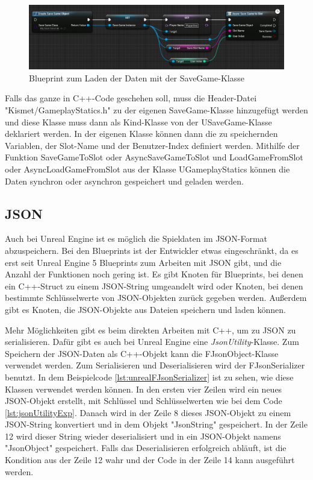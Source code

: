 \begin{figure}[htp]
    \centering
    \includegraphics[width=1\textwidth]{images/SaveGameBP.png}
    \caption{Blueprint zum Laden der Daten mit der SaveGame-Klasse\cite{unrealengineSavingLoading}}
    \label{fig:unrealSaveGameBluePrintLoad}
\end{figure}

Falls das ganze in C++-Code geschehen soll, muss die Header-Datei "Kismet/GameplayStatics.h" zu der eigenen SaveGame-Klasse hinzugefügt werden und diese Klasse muss dann als Kind-Klasse von der USaveGame-Klasse deklariert werden. In der eigenen Klasse können dann die zu speichernden Variablen, der Slot-Name und der Benutzer-Index definiert werden. Mithilfe der Funktion SaveGameToSlot oder AsyncSaveGameToSlot und LoadGameFromSlot oder AsyncLoadGameFromSlot aus der Klasse UGameplayStatics können die Daten synchron oder asynchron gespeichert und geladen werden.\cite{unrealengineSavingLoading}

\subsection{JSON}
Auch bei Unreal Engine ist es möglich die Spieldaten im JSON-Format abzuspeichern. Bei den Blueprints ist der Entwickler etwas eingeschränkt, da es erst seit Unreal Engine 5 Blueprints zum Arbeiten mit JSON gibt, und die Anzahl der Funktionen noch gering ist. Es gibt Knoten für Blueprints, bei denen ein
C++-Struct zu einem JSON-String umgeandelt wird oder Knoten, bei denen bestimmte Schlüsselwerte von JSON-Objekten zurück gegeben werden. Außerdem gibt es Knoten, die JSON-Objekte aus Dateien speichern und laden können.\cite{unrealengineJsonBlueprint}

Mehr Möglichkeiten gibt es beim direkten Arbeiten mit C++, um zu JSON zu serialisieren. Dafür gibt es auch bei Unreal Engine eine \textit{JsonUtility}-Klasse. Zum Speichern der JSON-Daten als C++-Objekt kann die FJsonObject-Klasse verwendet werden. Zum Serialisieren und Deserialisieren wird der FJsonSerializer benutzt. In dem Beispielcode \ref{lst:unrealFJsonSerializer} ist zu sehen, wie diese Klassen verwendet werden können. In den ersten vier Zeilen wird ein neues JSON-Objekt erstellt, mit Schlüssel und Schlüsselwerten wie bei dem Code \ref{lst:jsonUtilityExp}. Danach wird in der Zeile 8 dieses JSON-Objekt zu einem JSON-String konvertiert und in dem Objekt "JsonString" gespeichert. In der Zeile 12 wird dieser String wieder deserialisiert und in ein JSON-Objekt namens "JsonObject" gespeichert. Falls das Deserialisieren erfolgreich abläuft, ist die Kondition aus der Zeile 12 wahr und der Code in der Zeile 14 kann ausgeführt werden.\cite{unrealengineFJsonObject}\cite{unrealengineFJsonSerializer}\cite{wraiythUsingJson1}\cite{wraiythUsingJson2}

